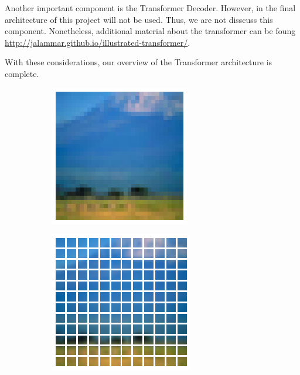 Another important component is the Transformer Decoder. However, in the final architecture of this project will not be used. Thus, we are not disscuss this component. Nonetheless, additional material about the transformer can be foung \url{http://jalammar.github.io/illustrated-transformer/}.

With these considerations, our overview of the Transformer architecture is complete.
\begin{figure}
    \begin{subfigure}{.5\textwidth}
        \centering
        \includegraphics[width=.9\linewidth]{figs/fullimage.png}
    \end{subfigure}
    \begin{subfigure}{.5\textwidth}
        \centering
        \includegraphics[width=.9\linewidth]{figs/patchedimage.png}

\end{subfigure}
\end{figure}
